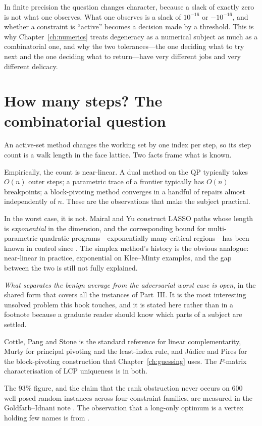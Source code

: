 \begin{remark}
\label{rem:degen-float}
In finite precision the question changes character, because a slack of exactly
zero is not what one observes. What one observes is a slack of $10^{-16}$ or
$-10^{-16}$, and whether a constraint is ``active'' becomes a decision made by a
threshold. This is why Chapter~\ref{ch:numerics} treats degeneracy as a numerical
subject as much as a combinatorial one, and why the two tolerances---the one
deciding what to try next and the one deciding what to return---have very
different jobs and very different delicacy.
\end{remark}

\section{How many steps? The combinatorial question}

An active-set method changes the working set by one index per step, so its step
count is a walk length in the face lattice. Two facts frame what is known.

Empirically, the count is near-linear. A dual method on the QP typically takes
$O(n)$ outer steps; a parametric trace of a frontier typically has $O(n)$
breakpoints; a block-pivoting method converges in a handful of repairs almost
independently of $n$. These are the observations that make the subject practical.

In the worst case, it is not. Mairal and Yu \cite{mairal2012} construct LASSO
paths whose length is \emph{exponential} in the dimension, and the corresponding
bound for multi-parametric quadratic programs---exponentially many critical
regions---has been known in control since \cite{tondel2003}. The simplex method's
history is the obvious analogue: near-linear in practice, exponential on
Klee--Minty examples, and the gap between the two is still not fully explained.

\emph{What separates the benign average from the adversarial worst case is open},
in the shared form that covers all the instances of Part~III. It is the most
interesting unsolved problem this book touches, and it is stated here rather than
in a footnote because a graduate reader should know which parts of a subject are
settled.

\begin{notes}
Cottle, Pang and Stone \cite{cottle1992} is the standard reference for linear
complementarity, Murty \cite{murty1988} for principal pivoting and the least-index
rule, and Júdice and Pires \cite{judice1994} for the block-pivoting construction
that Chapter~\ref{ch:guessing} uses. The $P$-matrix characterisation of LCP
uniqueness is in both.

The $93\%$ figure, and the claim that the rank obstruction never occurs on
$600$ well-posed random instances across four constraint families, are measured in
the Goldfarb--Idnani note \cite{schmelzer2026quadprog}. The observation that a long-only optimum is a vertex holding
few names is from \cite{schmelzer2026matrixfree}.
\end{notes}

